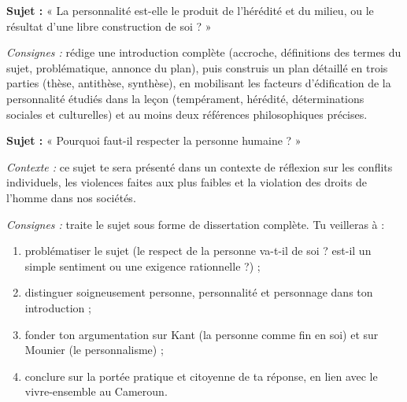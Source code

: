 \documentclass[11pt]{article}
\newcommand{\cle}[1]{{\popxbold\color{popdark}#1}}
\newcounter{popsec}
\newcounter{popsub}
\newcommand{\courssub}[1]{%
  \stepcounter{popsub}%
  \par\vspace{9pt}\noindent{\popxbold\fontsize{11.5}{13}\selectfont\color{popink}{\color{poporange}\thepopsec.\thepopsub}\hspace{6pt}#1}\par\nopagebreak\vspace{4pt}
}
\begin{document}
\courssub{Je me prépare au Bac}

\begin{exercice}
\textbf{Sujet :} « La personnalité est-elle le produit de l'hérédité et du milieu, ou le résultat d'une libre construction de soi ? »

\emph{Consignes :} rédige une introduction complète (accroche, définitions des termes du sujet, problématique, annonce du plan), puis construis un plan détaillé en trois parties (thèse, antithèse, synthèse), en mobilisant les facteurs d'édification de la personnalité étudiés dans la leçon (tempérament, hérédité, déterminations sociales et culturelles) et au moins deux références philosophiques précises.
\end{exercice}

\begin{exercice}
\textbf{Sujet :} « Pourquoi faut-il respecter la personne humaine ? »

\emph{Contexte :} ce sujet te sera présenté dans un contexte de réflexion sur les conflits individuels, les violences faites aux plus faibles et la violation des droits de l'homme dans nos sociétés.

\emph{Consignes :} traite le sujet sous forme de dissertation complète. Tu veilleras à :
\begin{enumerate}
\item problématiser le sujet (le respect de la personne va-t-il de soi ? est-il un simple sentiment ou une exigence rationnelle ?) ;
\item distinguer soigneusement \cle{personne}, \cle{personnalité} et \cle{personnage} dans ton introduction ;
\item fonder ton argumentation sur Kant (la personne comme fin en soi) et sur Mounier (le personnalisme) ;
\item conclure sur la portée pratique et citoyenne de ta réponse, en lien avec le vivre-ensemble au Cameroun.
\end{enumerate}
\end{exercice}
\end{document}
